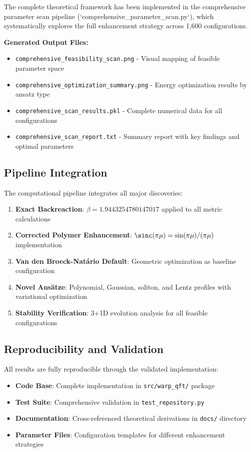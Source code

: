 \documentclass[11pt,a4paper]{article}
\begin{document}
The complete theoretical framework has been implemented in the comprehensive parameter scan pipeline (`comprehensive_parameter_scan.py`), which systematically explores the full enhancement strategy across 1,600 configurations.

\textbf{Generated Output Files:}
\begin{itemize}
\item \texttt{comprehensive\_feasibility\_scan.png} - Visual mapping of feasible parameter space
\item \texttt{comprehensive\_optimization\_summary.png} - Energy optimization results by ansatz type
\item \texttt{comprehensive\_scan\_results.pkl} - Complete numerical data for all configurations
\item \texttt{comprehensive\_scan\_report.txt} - Summary report with key findings and optimal parameters
\end{itemize}

\subsection{Pipeline Integration}

The computational pipeline integrates all major discoveries:
\begin{enumerate}
\item \textbf{Exact Backreaction}: $\beta = 1.9443254780147017$ applied to all metric calculations
\item \textbf{Corrected Polymer Enhancement}: $\sinc(\pi\mu) = \sin(\pi\mu)/(\pi\mu)$ implementation
\item \textbf{Van den Broeck-Natário Default}: Geometric optimization as baseline configuration
\item \textbf{Novel Ansätze}: Polynomial, Gaussian, soliton, and Lentz profiles with variational optimization
\item \textbf{Stability Verification}: 3+1D evolution analysis for all feasible configurations
\end{enumerate}

\subsection{Reproducibility and Validation}

All results are fully reproducible through the validated implementation:
\begin{itemize}
\item \textbf{Code Base}: Complete implementation in \texttt{src/warp\_qft/} package
\item \textbf{Test Suite}: Comprehensive validation in \texttt{test\_repository.py}
\item \textbf{Documentation}: Cross-referenced theoretical derivations in \texttt{docs/} directory
\item \textbf{Parameter Files}: Configuration templates for different enhancement strategies
\end{itemize}
\end{document}
